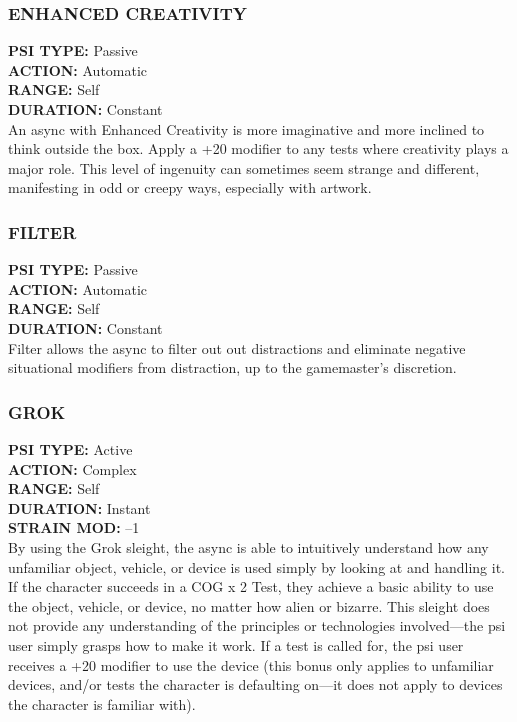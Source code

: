 \subsubsection{ENHANCED CREATIVITY} \textbf{PSI TYPE:} Passive \\ \textbf{ACTION:} Automatic \\ \textbf{RANGE:} Self \\ \textbf{DURATION:} Constant \\ An async with Enhanced Creativity is more imaginative and more inclined to think outside the box. Apply a +20 modifier to any tests where creativity plays a major role. This level of ingenuity can sometimes seem strange and different, manifesting in odd or creepy ways, especially with artwork. 

\subsubsection{FILTER} \textbf{PSI TYPE:} Passive \\ \textbf{ACTION:} Automatic \\ \textbf{RANGE:} Self \\ \textbf{DURATION:} Constant \\ Filter allows the async to filter out out distractions and eliminate negative situational modifiers from distraction, up to the gamemaster’s discretion. 

\subsubsection{GROK} \textbf{PSI TYPE:} Active \\ \textbf{ACTION:} Complex \\ \textbf{RANGE:} Self \\ \textbf{DURATION:} Instant \\ \textbf{STRAIN MOD:} –1 \\ By using the Grok sleight, the async is able to intuitively understand how any unfamiliar object, vehicle, or device is used simply by looking at and handling it. If the character succeeds in a COG x 2 Test, they achieve a basic ability to use the object, vehicle, or device, no matter how alien or bizarre. This sleight does not provide any understanding of the principles or technologies involved—the psi user simply grasps how to make it work. If a test is called for, the psi user receives a +20 modifier to use the device (this bonus only applies to unfamiliar devices, and/or tests the character is defaulting on—it does not apply to devices the character is familiar with). 

